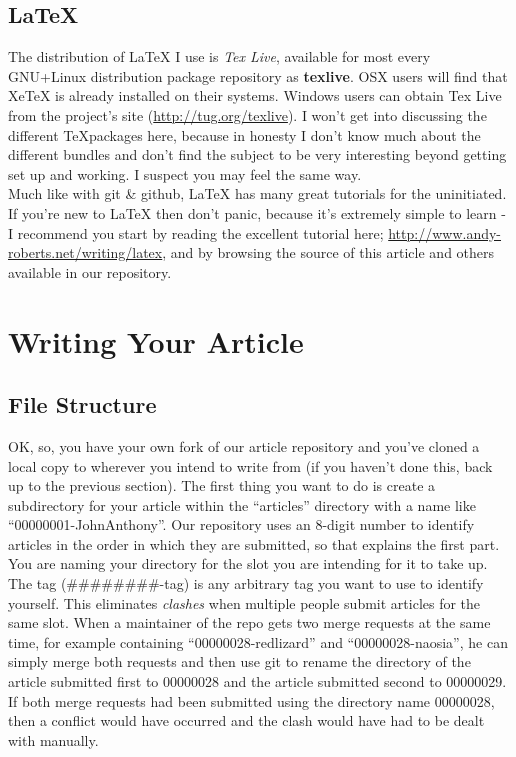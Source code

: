 \documentclass{article}
\begin{document}
\subsection{LaTeX{}}
  The distribution of \LaTeX{} I use is \emph{Tex Live}, available for most every GNU+Linux distribution package repository as \textbf{texlive}. OSX users will find that XeTeX is already installed on their systems. Windows users can obtain Tex Live from the project's site (\url{http://tug.org/texlive}). I won't get into discussing the different \TeX packages here, because in honesty I don't know much about the different bundles and don't find the subject to be very interesting beyond getting set up and working. I suspect you may feel the same way. \\
  Much like with git \& github, \LaTeX{} has many great tutorials for the uninitiated. If you're new to \LaTeX{} then don't panic, because it's extremely simple to learn - I recommend you start by reading the excellent tutorial here; \url{http://www.andy-roberts.net/writing/latex}, and by browsing the source of this article and others available in our repository.

\section{Writing Your Article}
\subsection{File Structure}
  OK, so, you have your own fork of our article repository and you've cloned a local copy to wherever you intend to write from (if you haven't done this, back up to the previous section). The first thing you want to do is create a subdirectory for your article within the ``articles'' directory with a name like ``00000001-JohnAnthony''. Our repository uses an 8-digit number to identify articles in the order in which they are submitted, so that explains the first part. You are naming your directory for the slot you are intending for it to take up. \\
  The tag (\#\#\#\#\#\#\#\#-tag) is any arbitrary tag you want to use to identify yourself. This eliminates \emph{clashes} when multiple people submit articles for the same slot. When a maintainer of the repo gets two merge requests at the same time, for example containing ``00000028-redlizard'' and ``00000028-naosia'', he can simply merge both requests and then use git to rename the directory of the article submitted first to 00000028 and the article submitted second to 00000029. If both merge requests had been submitted using the directory name 00000028, then a conflict would have occurred and the clash would have had to be dealt with manually. \\
\end{document}
